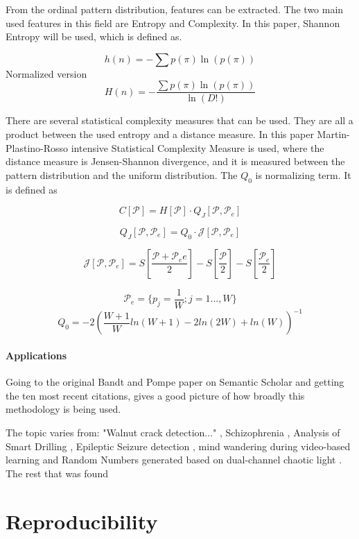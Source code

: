 From the ordinal pattern distribution, features can be extracted. The two main used features in this field are Entropy and Complexity. In this paper, Shannon Entropy will be used, which is defined as.

$$h(n)=-\sum p(\pi) \ln(p(\pi))$$
Normalized version
$$H(n)=-\frac{\sum p(\pi) \ln(p(\pi))}{\ln(D!)}$$

There are several statistical complexity measures that can be used. They are all a product between the used entropy and a distance measure. In this paper Martin-Plastino-Rosso intensive Statistical Complexity Measure is used, where the distance measure is Jensen-Shannon divergence, and it is measured between the pattern distribution and the uniform distribution. The $Q_0$ is normalizing term. It is defined as

$$C[\mathscr{P}]=H[\mathscr{P}]\cdot Q_J[\mathscr{P},\mathscr{P}_e]$$

$$Q_J[\mathscr{P},\mathscr{P}_e]=Q_0\cdot \mathscr{J}[\mathscr{P},\mathscr{P}_e]$$

$$\mathscr{J}[\mathscr{P},\mathscr{P}_e]=S[\frac{\mathscr{P}+\mathscr{P}_ee}{2}]-S[\frac{\mathscr{P}}{2}]-S[\frac{\mathscr{P}_e}{2}]$$

$$\mathscr{P}_e=\{p_j=\frac{1}{W};j=1...,W\}$$
$$Q_0 = -2(\frac{W+1}{W}ln(W+1)-2ln(2W)+ln(W))^{-1}$$
\cite{Amigo2023b}

\paragraph{Applications}
Going to the original Bandt and Pompe paper \cite{Bandt2002} on Semantic Scholar and getting the ten most recent citations, gives a good picture of how broadly this methodology is being used.

The topic varies from: "Walnut crack detection..." \cite{Zhang2024}, Schizophrenia \cite{Wang2024}, Analysis of Smart Drilling \cite{Szwajka2024}, Epileptic Seizure detection \cite{AbhishekParikh2024}, mind wandering during video-based learning \cite{Tang2024} and Random Numbers generated based on dual-channel chaotic light \cite{Liu2024}. The rest that was found \cite{Demirel2024, Du2024, Sun2024, Li2024}

\section{Reproducibility}
